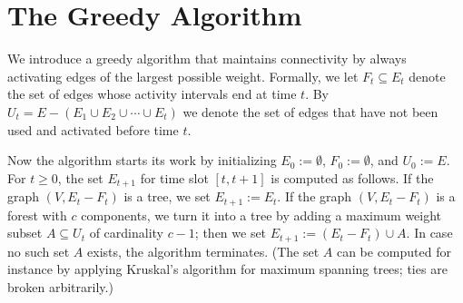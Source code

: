 \documentclass[runningheads]{llncs}
\newcommand{\greedy}{\text{\sf Greedy}}
\begin{document}
\section{The Greedy Algorithm}
\label{sec:greedy}
We introduce a greedy algorithm that maintains connectivity by always
activating edges of the largest possible weight.
Formally, we let $F_t\subseteq E_t$ denote the set of edges whose activity intervals 
end at time $t$.
By $U_t=E-(E_1\cup E_2\cup\cdots\cup E_t)$ we denote the set of edges that have not been 
used and activated before time $t$.

Now the {\greedy} algorithm starts its work by initializing 
$E_0:=\emptyset$, $F_0:=\emptyset$, and $U_0:=E$.
For $t\ge0$, the set $E_{t+1}$ for time slot $[t,t+1]$ is computed as follows.
If the graph $(V,E_t-F_t)$ is a tree, we set $E_{t+1}:=E_t$.
If the graph $(V,E_t-F_t)$ is a forest with $c$ components, we turn it into 
a tree by adding a maximum weight subset $A\subseteq U_t$ of cardinality $c-1$;
then we set $E_{t+1}:=(E_t-F_t)\cup A$.
In case no such set $A$ exists, the {\greedy} algorithm terminates.
(The set $A$ can be computed for instance by applying Kruskal's algorithm for 
maximum spanning trees; ties are broken arbitrarily.)
\end{document}
